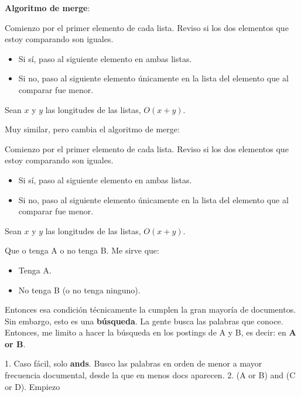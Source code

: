 \documentclass{fmbnotes}
\begin{document}
\textbf{Algoritmo de merge}:

Comienzo por el primer elemento de cada lista.
Reviso si los dos elementos que estoy comparando son iguales. 

\begin{itemize}
    \item Si sí, paso al siguiente elemento en ambas listas.
    \item Si no, paso al siguiente elemento únicamente en la lista del elemento que al comparar fue menor.
\end{itemize}

Sean \(x\) y \(y\) las longitudes de las listas, \(O(x+y)\).

\label{sec:a_textit_and_not_b}

Muy similar, pero cambia el algoritmo de merge:

Comienzo por el primer elemento de cada lista.
Reviso si los dos elementos que estoy comparando son iguales. 

\begin{itemize}
    \item Si sí, paso al siguiente elemento en ambas listas.
    \item Si no, paso al siguiente elemento únicamente en la lista del elemento que al comparar fue menor.
\end{itemize}

Sean \(x\) y \(y\) las longitudes de las listas, \(O(x+y)\).

\label{sec:a_textit_or_not_b}

Que o tenga A o no tenga B.
Me sirve que:

\begin{itemize}
    \item Tenga A.
    \item No tenga B (o no tenga ninguno).
\end{itemize}

Entonces esa condición técnicamente la cumplen la gran mayoría de documentos. 
Sin embargo, esto es una \textbf{búsqueda}. La gente busca las palabras que conoce. Entonces, me limito a hacer la búsqueda en los postings de A y B, es decir:  en \textbf{A or B}.

\label{sec:optimizar_consultas}

1. Caso fácil, solo \textbf{ands}. Busco las palabras en orden de menor a mayor frecuencia documental, desde la que en menos docs aparecen.
2. (A or B) and (C or D). Empiezo 
\end{document}
